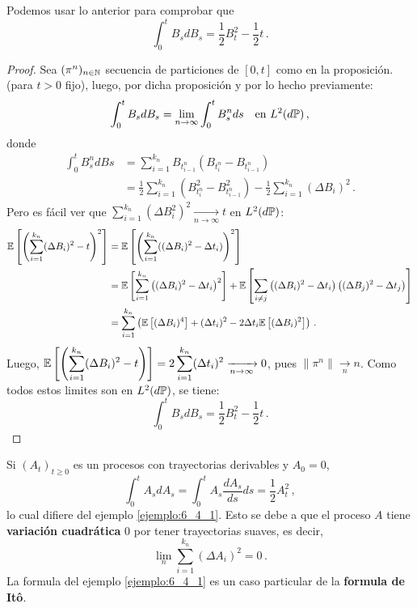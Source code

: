 \begin{example}
\label{ejemplo:6_4_1}
Podemos usar lo anterior para comprobar que 
$$\int_{0}^{t} B_s dB_s = \frac{1}{2} B_t^2 - \frac{1}{2}t \,.$$
\end{example}
\begin{proof}
\gris
Sea $(\pi^{n})_{n \in \N}$ secuencia de particiones de $[0,t]$ como en la proposición. (para $t >0$ fijo), luego, por dicha proposición y por lo hecho previamente:
\begin{equation*}
    \int_{0}^{t} B_s dB_s = \lim_{n \to \infty} \int_{0}^{t} B_s^n ds ~ ~ ~ \text{en } L^{2}(d\P)\,,
\end{equation*}
donde 
\begin{align*}
    \int_{0}^{t} B_s^n dBs 
    &= \sum_{i=1}^{k_n} B_{t_{i-1}^n}(B_{t_{i}^n} - B_{t_{i-1}^n}) \\ 
    &= \frac{1}{2} \sum_{i=1}^{k_n} (B_{t_{i}^n}^2 - B_{t_{i-1}^n}^2) -
    \frac{1}{2} \sum_{i=1}^{k_n} (\Delta B_i)^2\,.
\end{align*}
Pero es fácil ver que $\displaystyle\sum_{i=1}^{k_n} (\Delta B_i^2)^2 \xrightarrow[n \to \infty]{} t$ en 
$L^2(d\P)$: 
\begin{align*}
    \E \left[ \left( \sum_{i=1}^{k_n} (\Delta B_i)^2 - t \right)^2 \right]
    & = \E \left[ \left( \sum_{i=1}^{k_n} ((\Delta B_i)^2 - \Delta t_i)  \right)^2 \right] \\
    &= \E \left[ \sum_{i=1}^{k_n} \left( (\Delta B_i)^2 - \Delta t_i  \right)^2 \right] + \E \left[ \sum_{i \neq j} \left( (\Delta B_i)^2 - \Delta t_i \right) \left( (\Delta B_j)^2 - \Delta t_j \right) \right] \\
    &= \sum_{i=1}^{k_n} \left( \E \left[ (\Delta B_i)^4 \right] + (\Delta t_i)^2 -2\Delta t_i \E \left[ (\Delta B_i)^2 \right] \right)\,.
\end{align*}
Luego, $\displaystyle \E \left[ \left( \sum_{i=1}^{k_n} (\Delta B_i )^2 - t \right)  \right] = 2 \sum_{i=1}^{k_n} (\Delta t_i)^2 \xrightarrow[n \to \infty]{} 0$, pues $\|\pi^n\| \xrightarrow[n]{} n$. Como todos estos limites son en $L^2(d\P)$, se tiene:
\begin{equation*}
    \label{eq:ej}
    \int_{0}^{t} B_s dB_s = \frac{1}{2} B_t^2 - \frac{1}{2}t \,.
\end{equation*}
\findem
\negro
\end{proof}

\begin{remark}
Si $(A_t)_{t \ge 0}$ es un procesos con trayectorias derivables y $A_0 = 0$, 
\begin{equation*}
    \int_{0}^{t} A_s dA_s = \int_{0}^{t} A_s \frac{dA_s}{ds} ds = \frac{1}{2} A^2_t\,,
\end{equation*}
lo cual difiere del ejemplo \ref{ejemplo:6_4_1}. Esto se debe a que el proceso $A$ tiene \textbf{variación cuadrática} $0$ por tener trayectorias suaves, es decir, 
\begin{equation*}
    \lim_{n} \sum_{i=1}^{k_n} (\Delta A_i)^2 = 0\,.
\end{equation*}
La formula del ejemplo \ref{ejemplo:6_4_1} es un caso particular de la \textbf{formula de It\^{o}}.
\end{remark}

